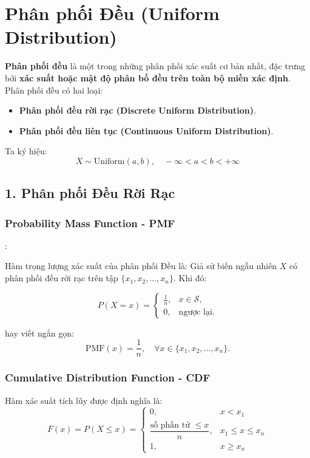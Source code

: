 \section{Phân phối Đều (Uniform Distribution)}

\textbf{Phân phối đều} là một trong những phân phối xác suất cơ bản nhất, đặc trưng bởi \textbf{xác suất hoặc mật độ phân bố đều trên toàn bộ miền xác định}.  
Phân phối đều có hai loại:
\begin{itemize}
    \item \textbf{Phân phối đều rời rạc (Discrete Uniform Distribution)}.
    \item \textbf{Phân phối đều liên tục (Continuous Uniform Distribution)}.
\end{itemize}

Ta ký hiệu:
\[
X \sim \mathrm{Uniform}(a, b), \quad -\infty < a < b < +\infty
\]

\subsection{1. Phân phối Đều Rời Rạc}

\subsubsection{Probability Mass Function - PMF}:

Hàm trọng lượng xác suất của phân phối Đều là:
Giả sử biến ngẫu nhiên \( X \) có phân phối đều rời rạc trên tập \( \{x_1, x_2, \ldots, x_n\} \). Khi đó:

\[
P(X = x) =
\begin{cases}
\displaystyle \frac{1}{n}, & x \in \mathcal{S}, \\[1em]
0, & \text{ngược lại}.
\end{cases}
\]

hay viết ngắn gọn:
\[
\mathrm{PMF}(x) = \frac{1}{n}, \quad \forall x \in \{x_1, x_2, \ldots, x_n\}.
\]

\subsubsection{Cumulative Distribution Function - CDF}

Hàm xác suất tích lũy được định nghĩa là:
\[
F(x) = P(X \le x) =
\begin{cases}
0, & x < x_1 \\[0.5em]
\dfrac{\text{số phần tử } \le x}{n}, & x_1 \le x \le x_n \\[0.8em]
1, & x \ge x_n
\end{cases}
\]
  
